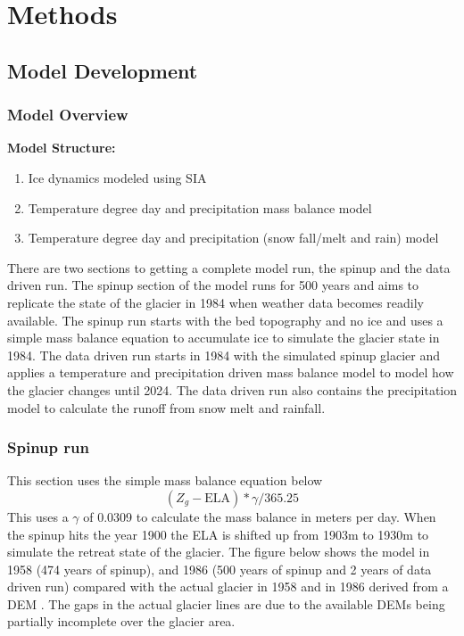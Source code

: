 \documentclass{article}
\begin{document}
\section{Methods}

\subsection{Model Development}
\subsubsection{Model Overview}

\textbf{Model Structure:}
\begin{enumerate}[leftmargin=2cm]
    \item Ice dynamics modeled using SIA
    \item Temperature degree day and precipitation mass balance model
    \item Temperature degree day and precipitation (snow fall/melt and rain) model
\end{enumerate}

There are two sections to getting a complete model run, the spinup and the data driven run. The spinup section of the model runs for 500 years and aims to replicate the 
state of the glacier in 1984 when weather data becomes readily available. The spinup run starts with the bed topography and no ice and uses a simple mass balance 
equation to accumulate ice to simulate the glacier state in 1984. The data driven run starts in 1984 with the simulated spinup glacier and applies a temperature and 
precipitation driven mass balance model to model how the glacier changes until 2024. The data driven run also contains the precipitation model to calculate the runoff 
from snow melt and rainfall.

\subsubsection{Spinup run}
This section uses the simple mass balance equation below
\begin{equation}(Z_g-\text{ELA})*\gamma /365.25\end{equation}
This uses a $\gamma$ of 0.0309 to calculate the mass balance in meters per day. When the spinup hits the year 1900 the ELA is shifted up from 1903m to 1930m to simulate the 
retreat state of the glacier. The figure below shows the model in 1958 (474 years of spinup), and 1986 (500 years of spinup and 2 years of data driven run) compared with the actual 
glacier in 1958 and in 1986 derived from a DEM \cite{ref3}. The gaps in the actual glacier lines are due to the available DEMs being partially incomplete over the glacier area.
\end{document}
